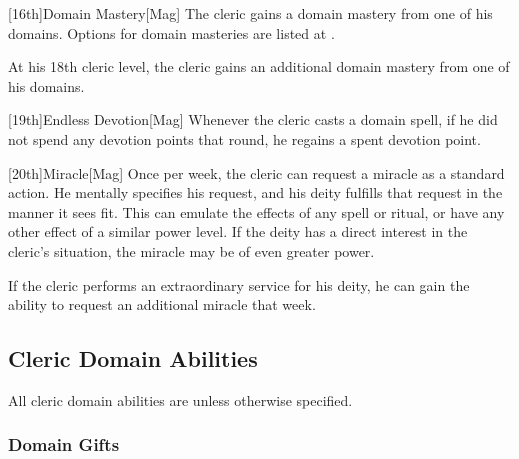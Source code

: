         [16th]{Domain Mastery}[Mag]
        The cleric gains a domain mastery from one of his domains.
        Options for domain masteries are listed at .

        At his 18th cleric level, the cleric gains an additional domain mastery from one of his domains.

        [19th]{Endless Devotion}[Mag]
        Whenever the cleric casts a domain spell, if he did not spend any devotion points that round, he regains a spent devotion point.

        [20th]{Miracle}[Mag]
        Once per week, the cleric can request a miracle as a standard action.
        He mentally specifies his request, and his deity fulfills that request in the manner it sees fit.
        This can emulate the effects of any spell or ritual, or have any other effect of a similar power level.
        If the deity has a direct interest in the cleric's situation, the miracle may be of even greater power.

        If the cleric performs an extraordinary service for his deity, he can gain the ability to request an additional miracle that week.

    \subsection{Cleric Domain Abilities}
        All cleric domain abilities are  unless otherwise specified.

        \subsubsection{Domain Gifts}\label{Domain Gifts}


